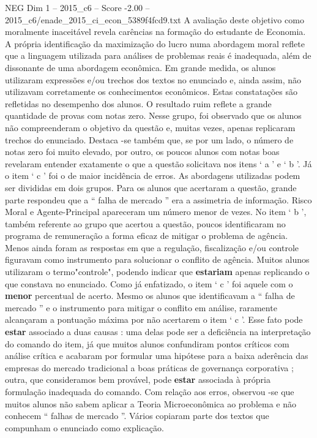 \begin{textsample}{NEG Dim 1 – 2015\_c6 – Score -2.00 – 2015\_c6/enade\_2015\_ci\_econ\_5389f4fcd9.txt}
A avaliação deste objetivo como moralmente inaceitável revela carências na formação do estudante de Economia.
A própria identificação da maximização do lucro numa abordagem moral reflete que a linguagem utilizada para análises de problemas reais é inadequada, além de dissonante de uma abordagem econômica.
Em grande medida, os alunos utilizaram expressões e/ou trechos dos textos no enunciado e, ainda assim, não utilizavam corretamente os conhecimentos econômicos.
Estas constatações são refletidas no desempenho dos alunos.
O resultado ruim reflete a grande quantidade de provas com notas zero.
Nesse grupo, foi observado que os alunos não compreenderam o objetivo da questão e, muitas vezes, apenas replicaram trechos do enunciado.
Destaca -se também que, se por um lado, o número de notas zero foi muito elevado, por outro, os poucos alunos com notas boas revelaram entender exatamente o que a questão solicitava nos itens ‘ a ’ e ‘ b ’.
Já o item ‘ c ’ foi o de maior incidência de erros.
As abordagens utilizadas podem ser divididas em dois grupos.
Para os alunos que acertaram a questão, grande parte respondeu que a “ falha de mercado ” era a assimetria de informação.
Risco Moral e Agente-Principal apareceram um número menor de vezes.
No item ‘ b ’, também referente ao grupo que acertou a questão, poucos identificaram no programa de remuneração a forma eficaz de mitigar o problema de agência.
Menos ainda foram as respostas em que a regulação, fiscalização e/ou controle figuravam como instrumento para solucionar o conflito de agência.
Muitos alunos utilizaram o termo"controle", podendo indicar que \textbf{estariam} apenas replicando o que constava no enunciado.
Como já enfatizado, o item ‘ c ’ foi aquele com o \textbf{menor} percentual de acerto.
Mesmo os alunos que identificavam a “ falha de mercado ” e o instrumento para mitigar o conflito em análise, raramente alcançaram a pontuação máxima por não acertarem o item ‘ c ’.
Esse fato pode \textbf{estar} associado a duas causas : uma delas pode ser a deficiência na interpretação do comando do item, já que muitos alunos confundiram pontos críticos com análise crítica e acabaram por formular uma hipótese para a baixa aderência das empresas do mercado tradicional a boas práticas de governança corporativa ; outra, que consideramos bem provável, pode \textbf{estar} associada à própria formulação inadequada do comando.
Com relação aos erros, observou -se que muitos alunos não sabem aplicar a Teoria Microeconômica ao problema e não conhecem “ falhas de mercado ”.
Vários copiaram parte dos textos que compunham o enunciado como explicação.

\end{textsample}
